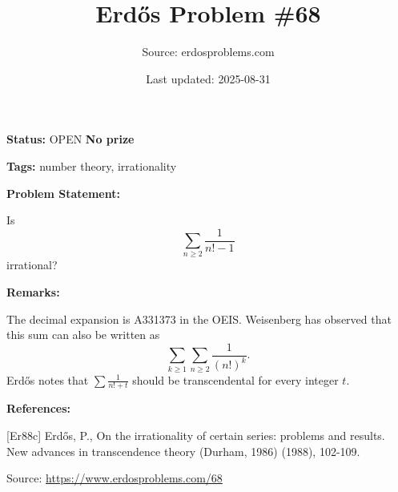 \documentclass{article}
\title{Erd\H{o}s Problem \#68}
\date{Last updated: 2025-08-31}
\author{Source: erdosproblems.com}
\begin{document}
\maketitle

\noindent\textbf{Status:} OPEN \quad \textbf{No prize}

\noindent\textbf{Tags:} number theory, irrationality

\medskip
\noindent\textbf{Problem Statement:}

Is\[\sum_{n\geq 2}\frac{1}{n!-1}\]irrational?

\bigskip
\noindent\textbf{Remarks:}

The decimal expansion is A331373 in the OEIS. Weisenberg has observed that this sum can also be written as\[\sum_{k\geq 1}\sum_{n\geq 2}\frac{1}{(n!)^k}.\]Erd\H{o}s \cite{Er88c} notes that $\sum \frac{1}{n!+t}$ should be transcendental for every integer $t$.

\bigskip
\noindent\textbf{References:}

[Er88c] Erd\H{o}s, P., On the irrationality of certain series: problems and results. New advances in transcendence theory (Durham, 1986) (1988), 102-109.

\bigskip
\noindent\small{Source: \url{https://www.erdosproblems.com/68}}
\end{document}
